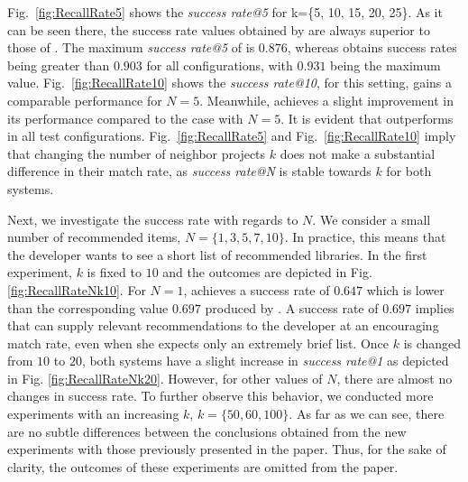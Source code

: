 Fig.~\ref{fig:RecallRate5} shows the \emph{success rate@5} for k=\{5, 10, 15, 20, 25\}. As it can be seen there, the success rate values obtained by \CR are always superior to those of \LR. The maximum \emph{success rate@5} of \LR is $0.876$, whereas \CR obtains success rates being greater than $0.903$ for all configurations, with $0.931$ being the maximum value. Fig.~\ref{fig:RecallRate10} shows the \emph{success rate@10}, for this setting, \LR gains a comparable performance for $N=5$. Meanwhile, \CR achieves a slight improvement in its performance compared to the case with $N=5$. It is evident that \CR outperforms \LR in all test configurations. Fig.~\ref{fig:RecallRate5} and Fig.~\ref{fig:RecallRate10} imply that changing the number of neighbor projects $k$ does not make a substantial difference in their match rate, as \emph{success rate@N} is stable towards $k$ for both systems.

Next, we investigate the success rate with regards to $N$. We consider a small number of recommended items, \ie $N=\{1,3,5,7,10\}$. In practice, this means that the developer wants to see a short list of recommended libraries. In the first experiment, $k$ is fixed to $10$ and the outcomes are depicted in Fig. \ref{fig:RecallRateNk10}. For $N=1$, \LR achieves a success rate of $0.647$ which is lower than the corresponding value $0.697$ produced by \CR. A success rate of $0.697$ implies that \CR can supply relevant recommendations to the developer at an encouraging match rate, even when she expects only an extremely brief list. Once $k$ is changed from $10$ to $20$, both systems have a slight increase in \emph{success rate@1} as depicted in Fig. \ref{fig:RecallRateNk20}. However, for other values of $N$, there are almost no changes in success rate. To further observe this behavior, we conducted more experiments with an increasing $k$, \eg $k=\{50,60,100\}$. As far as we can see, there are no subtle differences between the conclusions obtained from the new experiments with those previously presented in the paper. Thus, for the sake of clarity, the outcomes of these experiments are omitted from the paper.


